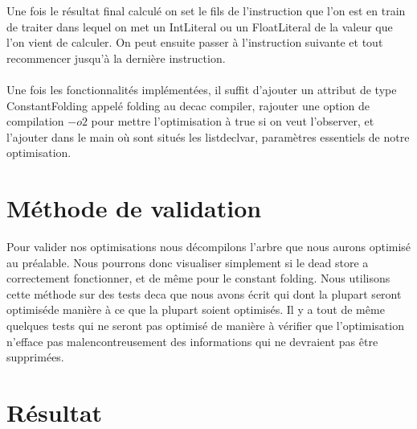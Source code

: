 \documentclass[a4paper]{article}
\begin{document}
Une fois le résultat final calculé on set le fils de l'instruction que l'on est en train de traiter dans lequel on met un IntLiteral ou un FloatLiteral de la valeur que l'on vient de calculer. On peut ensuite passer à l'instruction suivante et tout recommencer jusqu'à la dernière instruction.\\ \\
Une fois les fonctionnalités implémentées, il suffit d'ajouter un attribut de type ConstantFolding appelé folding au decac compiler, rajouter une option de compilation $-o2$ pour mettre l'optimisation à true si on veut l'observer, et l'ajouter dans le main où sont situés les listdeclvar, paramètres essentiels de notre optimisation.

\section{Méthode de validation}
Pour valider nos optimisations nous décompilons l'arbre que nous aurons optimisé au préalable. Nous pourrons donc visualiser simplement si le dead store a correctement fonctionner, et de même pour le constant folding. Nous utilisons cette méthode sur des tests deca que nous avons écrit qui dont la plupart seront optimiséde manière à ce que la plupart soient optimisés. Il y a tout de même quelques tests qui ne seront pas optimisé de manière à vérifier que l'optimisation n'efface pas malencontreusement des informations qui ne devraient pas être supprimées.
\section{Résultat}
\end{document}
